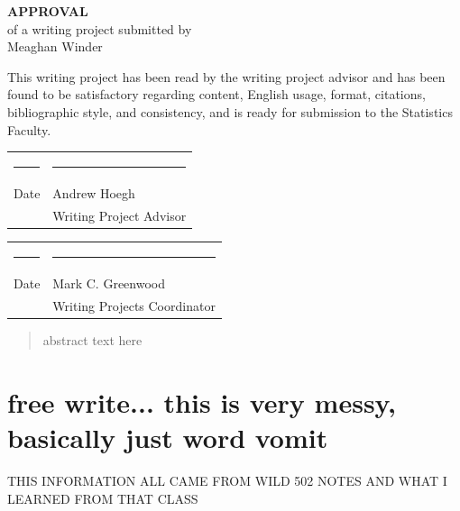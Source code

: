 \documentclass[12pt]{article}\usepackage[]{graphicx}\usepackage[]{color}
\begin{document}
\begin{titlepage}
\null
\begin{center}
{\bf\huge APPROVAL}\\[1.0 in]
of a writing project submitted by\\[.25 in]
Meaghan Winder \\[0.5 in]
\end{center}

\noindent
This writing project has been read by the writing project advisor and
has been found to be satisfactory regarding content, English usage,
format, citations, bibliographic style, and consistency, and is ready
for submission to the Statistics Faculty.

\vspace{.3in}
\begin{center}
\begin{tabular}{ll}
\rule{2.75in}{.03in} & \rule{2.75in}{.03in} \\
Date& Andrew Hoegh \\
& Writing Project Advisor \\
\end{tabular}
\end{center}

\vspace{1cm}

\begin{center}
\begin{tabular}{ll}
\rule{2.75in}{.03in} & \rule{2.75in}{.03in} \\
Date& Mark C. Greenwood \\
& Writing Projects Coordinator \\
\end{tabular}
\end{center}

\end{titlepage}

\newpage
\tableofcontents
\newpage

\begin{abstract}
\noindent abstract text here 
\end{abstract}

\doublespacing

\section{free write... this is very messy, basically just word vomit}

THIS INFORMATION ALL CAME FROM WILD 502 NOTES AND WHAT I LEARNED FROM THAT CLASS
\end{document}
